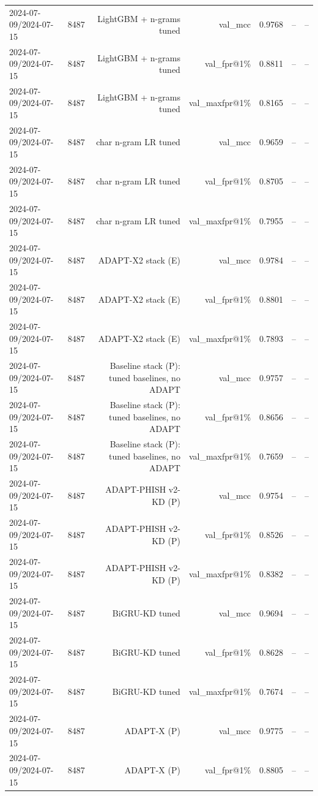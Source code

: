 \begin{table}[t]
\begin{tabular}{llrrrrr}
2024-07-09/2024-07-15 & 8487 & LightGBM + n-grams tuned & val\_mcc & 0.9768 & -- & -- \\
2024-07-09/2024-07-15 & 8487 & LightGBM + n-grams tuned & val\_fpr@1\% & 0.8811 & -- & -- \\
2024-07-09/2024-07-15 & 8487 & LightGBM + n-grams tuned & val\_maxfpr@1\% & 0.8165 & -- & -- \\
2024-07-09/2024-07-15 & 8487 & char n-gram LR tuned & val\_mcc & 0.9659 & -- & -- \\
2024-07-09/2024-07-15 & 8487 & char n-gram LR tuned & val\_fpr@1\% & 0.8705 & -- & -- \\
2024-07-09/2024-07-15 & 8487 & char n-gram LR tuned & val\_maxfpr@1\% & 0.7955 & -- & -- \\
2024-07-09/2024-07-15 & 8487 & ADAPT-X2 stack (E) & val\_mcc & 0.9784 & -- & -- \\
2024-07-09/2024-07-15 & 8487 & ADAPT-X2 stack (E) & val\_fpr@1\% & 0.8801 & -- & -- \\
2024-07-09/2024-07-15 & 8487 & ADAPT-X2 stack (E) & val\_maxfpr@1\% & 0.7893 & -- & -- \\
2024-07-09/2024-07-15 & 8487 & Baseline stack (P): tuned baselines, no ADAPT & val\_mcc & 0.9757 & -- & -- \\
2024-07-09/2024-07-15 & 8487 & Baseline stack (P): tuned baselines, no ADAPT & val\_fpr@1\% & 0.8656 & -- & -- \\
2024-07-09/2024-07-15 & 8487 & Baseline stack (P): tuned baselines, no ADAPT & val\_maxfpr@1\% & 0.7659 & -- & -- \\
2024-07-09/2024-07-15 & 8487 & ADAPT-PHISH v2-KD (P) & val\_mcc & 0.9754 & -- & -- \\
2024-07-09/2024-07-15 & 8487 & ADAPT-PHISH v2-KD (P) & val\_fpr@1\% & 0.8526 & -- & -- \\
2024-07-09/2024-07-15 & 8487 & ADAPT-PHISH v2-KD (P) & val\_maxfpr@1\% & 0.8382 & -- & -- \\
2024-07-09/2024-07-15 & 8487 & BiGRU-KD tuned & val\_mcc & 0.9694 & -- & -- \\
2024-07-09/2024-07-15 & 8487 & BiGRU-KD tuned & val\_fpr@1\% & 0.8628 & -- & -- \\
2024-07-09/2024-07-15 & 8487 & BiGRU-KD tuned & val\_maxfpr@1\% & 0.7674 & -- & -- \\
2024-07-09/2024-07-15 & 8487 & ADAPT-X (P) & val\_mcc & 0.9775 & -- & -- \\
2024-07-09/2024-07-15 & 8487 & ADAPT-X (P) & val\_fpr@1\% & 0.8805 & -- & -- \\

\end{tabular}
\end{table}
